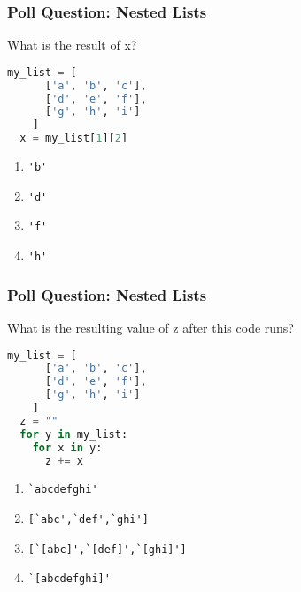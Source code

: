 \documentclass{beamer}
\begin{document}
%
%
\begin{frame}[fragile]
  \frametitle{Poll Question: Nested Lists}
  What is the result of x?
  \begin{lstlisting}[language=Python, autogobble]
  my_list = [
      ['a', 'b', 'c'],
      ['d', 'e', 'f'],
      ['g', 'h', 'i']
    ]
  x = my_list[1][2]
  \end{lstlisting}
  \vfill
  \begin{enumerate}[A]
    \item \lstinline|'b'|
    \item \lstinline|'d'|
    \item \lstinline|'f'|
    \item \lstinline|'h'|
  \end{enumerate}
\end{frame}

%
%
\begin{frame}[fragile]
  \frametitle{Poll Question: Nested Lists}
  What is the resulting value of z after this code runs?
  \begin{lstlisting}[language=Python, autogobble]
  my_list = [
      ['a', 'b', 'c'],
      ['d', 'e', 'f'],
      ['g', 'h', 'i']
    ]
  z = ""
  for y in my_list:
    for x in y:
      z += x
  \end{lstlisting}
  \vfill
  \begin{enumerate}[A]
    \item \lstinline|`abcdefghi'|
    \item \lstinline|[`abc',`def',`ghi']|
    \item \lstinline|[`[abc]',`[def]',`[ghi]']|
    \item \lstinline|`[abcdefghi]'|
  \end{enumerate}
\end{frame}
\end{document}
